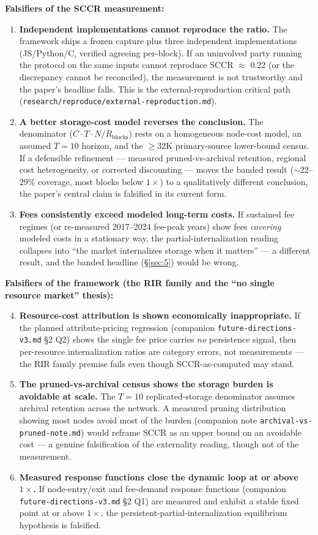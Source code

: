 \documentclass[11pt]{article}
\begin{document}
\textbf{Falsifiers of the SCCR measurement:}
\begin{enumerate}[nosep]
  \item \textbf{Independent implementations cannot reproduce the ratio.} The framework ships a frozen capture plus three independent implementations (JS/Python/C, verified agreeing per-block). If an uninvolved party running the protocol on the same inputs cannot reproduce SCCR $\approx$ 0.22 (or the discrepancy cannot be reconciled), the measurement is not trustworthy and the paper's headline falls. This is the external-reproduction critical path (\texttt{research/reproduce/external-reproduction.md}).
  \item \textbf{A better storage-cost model reverses the conclusion.} The denominator ($C \cdot T \cdot N / R_{\mathrm{blocks}}$) rests on a homogeneous node-cost model, an assumed $T=10$ horizon, and the $\geq$32K primary-source lower-bound census. If a defensible refinement --- measured pruned-vs-archival retention, regional cost heterogeneity, or corrected discounting --- moves the banded result ($\sim$22--29\% coverage, most blocks below $1\times$) to a qualitatively different conclusion, the paper's central claim is falsified in its current form.
  \item \textbf{Fees consistently exceed modeled long-term costs.} If sustained fee regimes (or re-measured 2017--2024 fee-peak years) show fees \emph{covering} modeled costs in a stationary way, the partial-internalization reading collapses into ``the market internalizes storage when it matters'' --- a different result, and the banded headline (\S\ref{sec:5}) would be wrong.
\end{enumerate}

\textbf{Falsifiers of the framework (the RIR family and the ``no single resource market'' thesis):}
\begin{enumerate}[nosep]
  \setcounter{enumi}{3}
  \item \textbf{Resource-cost attribution is shown economically inappropriate.} If the planned attribute-pricing regression (companion \texttt{future-directions-v3.md} \S2 Q2) shows the single fee price carries \emph{no} persistence signal, then per-resource internalization ratios are category errors, not measurements --- the RIR family premise fails even though SCCR-as-computed may stand.
  \item \textbf{The pruned-vs-archival census shows the storage burden is avoidable at scale.} The $T=10$ replicated-storage denominator assumes archival retention across the network. A measured pruning distribution showing most nodes avoid most of the burden (companion note \texttt{archival-vs-pruned-note.md}) would reframe SCCR as an upper bound on an avoidable cost --- a genuine falsification of the externality reading, though not of the measurement.
  \item \textbf{Measured response functions close the dynamic loop at or above $1\times$.} If node-entry/exit and fee-demand response functions (companion \texttt{future-directions-v3.md} \S2 Q1) are measured and exhibit a stable fixed point at or above $1\times$, the persistent-partial-internalization equilibrium hypothesis is falsified.
\end{enumerate}
\end{document}
